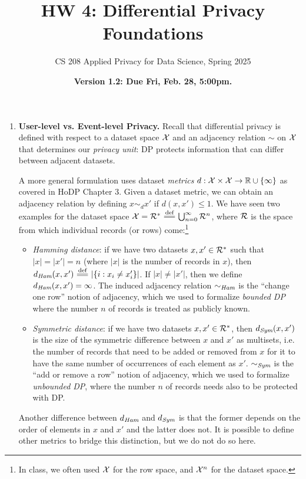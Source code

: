 \documentclass[11pt]{article}
\title{\vspace{-1.5cm} HW 4: Differential Privacy Foundations}
\author{CS 208 Applied Privacy for Data Science, Spring 2025}
\date{\textbf{Version 1.2: Due Fri, Feb. 28, 5:00pm.}}
\begin{document}
\maketitle

\instructions

\begin{enumerate}[leftmargin=*]

\item \textbf{User-level vs. Event-level Privacy.} 
Recall that differential privacy is defined with respect to a dataset space $\mathcal{X}$ and an adjacency relation $\sim$
on $\mathcal{X}$ that determines our {\em privacy unit}: DP protects information that can differ between adjacent datasets.

A more general formulation uses dataset {\em metrics} $d : \mathcal{X}\times\mathcal{X} \rightarrow \mathbb{R}\cup \{\infty\}$ as covered in HoDP Chapter 3.  Given a dataset metric, we can obtain an adjacency relation by defining $x\sim_d x'$ if $d(x,x')\leq 1$.
We have seen two examples for the dataset space $\cX = \cR^* \eqdef \bigcup_{n=0}^\infty \cR^n$, where $\mathcal{R}$ is the space from which individual records (or rows) come:\footnote{In class, we often used $\mathcal{X}$ for the row space, and $\mathcal{X}^n$ for the dataset space.} 
\begin{itemize}
\item {\em Hamming distance}: if we have two datasets $x,x'\in \mathcal{R}^*$ such that $|x|=|x'|=n$ (where $|x|$ is the number of records in $x$), then $d_\Ham(x,x') \eqdef |\{i : x_i\neq x'_i\}|$.  If $|x|\neq |x'|$, then we define $d_{\textit{Ham}}(x,x')=\infty$. The induced adjacency relation $\sim_{\textit{Ham}}$ is the ``change one row'' notion of adjacency, which we used to formalize {\em bounded DP} where the number $n$ of records is treated as publicly known.
\item {\em Symmetric distance}: if we have two datasets $x,x'\in \mathcal{R}^*$, then $d_{\textit{Sym}}(x,x')$ is the size of the symmetric difference between $x$ and $x'$ as multisets, i.e. the number of records that need to be added or removed from $x$ for it to have the same number of occurrences of each element as $x'$.  $\sim_{\textit{Sym}}$ is the ``add or remove a row'' notion of adjacency, which we used to formalize {\em unbounded DP}, where the number $n$ of records needs also to be protected with DP.
\end{itemize}
Another difference between $d_{\textit{Ham}}$ and $d_{\textit{Sym}}$ is that the former depends on the order of elements in $x$ and $x'$ and the latter does not. It is possible to define other metrics to bridge this distinction, but we do not do so here.


\end{enumerate}
\end{document}
